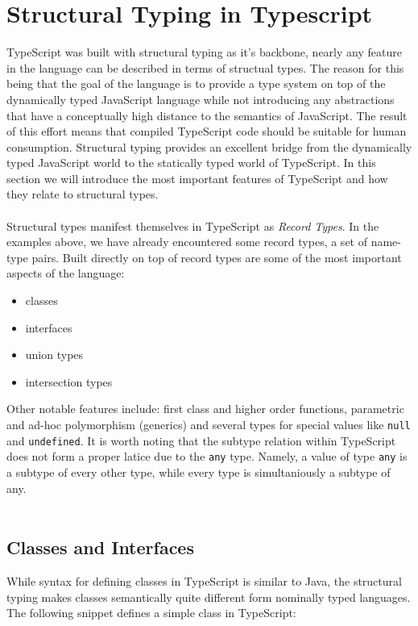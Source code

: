 \section{Structural Typing in Typescript}
\label{sec:structural-typing-typescript}
TypeScript was built with structural typing as it's backbone, 
nearly any feature in the language can be described in terms of structual types.
The reason for this being that the goal of the language is to provide a type system
on top of the dynamically typed JavaScript language while not introducing any 
abstractions that have a conceptually high distance to the semantics of JavaScript.
The result of this effort means that compiled TypeScript code should be suitable 
for human consumption. Structural typing provides an excellent bridge from the 
dynamically typed JavaScript world to the statically typed world of TypeScript.
In this section we will introduce the most important features of TypeScript and
how they relate to structural types.
\\
\\
Structural types manifest themselves in TypeScript as \textit{Record Types}.
In the examples above, we have already encountered some record types, a set of name-type pairs.
Built directly on top of record types are some of the most important aspects of the language:
\begin{itemize}
\item classes
\item interfaces
\item union types
\item intersection types
\end{itemize}

Other notable features include: first class and higher order functions, parametric and ad-hoc polymorphism 
(generics) and several types for special values like \texttt{null} and \texttt{undefined}. It is 
worth noting that the subtype relation within TypeScript does not form a proper latice due to 
the \texttt{any} type. Namely, a value of type \texttt{any} is a subtype of every other type, 
while every type is simultaniously a subtype of any.
\\
\\
\subsection{Classes and Interfaces}
While syntax for defining classes in TypeScript is similar to Java, the structural typing makes classes semantically quite different form nominally typed languages.
The following snippet defines a simple class in TypeScript:

